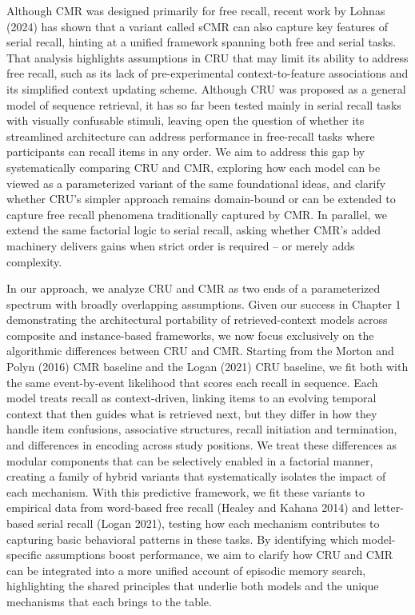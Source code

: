 \documentclass[
  letterpaper,
  11pt,
  english,
  singlespacing,
  headsepline]{MastersDoctoralThesis}
\begin{document}
Although CMR was designed primarily for free recall, recent work by
Lohnas (2024) has shown that a variant called sCMR can also capture key
features of serial recall, hinting at a unified framework spanning both
free and serial tasks. That analysis highlights assumptions in CRU that
may limit its ability to address free recall, such as its lack of
pre-experimental context-to-feature associations and its simplified
context updating scheme. Although CRU was proposed as a general model of
sequence retrieval, it has so far been tested mainly in serial recall
tasks with visually confusable stimuli, leaving open the question of
whether its streamlined architecture can address performance in
free-recall tasks where participants can recall items in any order. We
aim to address this gap by systematically comparing CRU and CMR,
exploring how each model can be viewed as a parameterized variant of the
same foundational ideas, and clarify whether CRU's simpler approach
remains domain-bound or can be extended to capture free recall phenomena
traditionally captured by CMR. In parallel, we extend the same factorial
logic to serial recall, asking whether CMR's added machinery delivers
gains when strict order is required -- or merely adds complexity.

In our approach, we analyze CRU and CMR as two ends of a parameterized
spectrum with broadly overlapping assumptions. Given our success in
Chapter 1 demonstrating the architectural portability of
retrieved-context models across composite and instance-based frameworks,
we now focus exclusively on the algorithmic differences between CRU and
CMR. Starting from the Morton and Polyn (2016) CMR baseline and the
Logan (2021) CRU baseline, we fit both with the same event-by-event
likelihood that scores each recall in sequence. Each model treats recall
as context-driven, linking items to an evolving temporal context that
then guides what is retrieved next, but they differ in how they handle
item confusions, associative structures, recall initiation and
termination, and differences in encoding across study positions. We
treat these differences as modular components that can be selectively
enabled in a factorial manner, creating a family of hybrid variants that
systematically isolates the impact of each mechanism. With this
predictive framework, we fit these variants to empirical data from
word-based free recall (Healey and Kahana 2014) and letter-based serial
recall (Logan 2021), testing how each mechanism contributes to capturing
basic behavioral patterns in these tasks. By identifying which
model-specific assumptions boost performance, we aim to clarify how CRU
and CMR can be integrated into a more unified account of episodic memory
search, highlighting the shared principles that underlie both models and
the unique mechanisms that each brings to the table.
\end{document}
